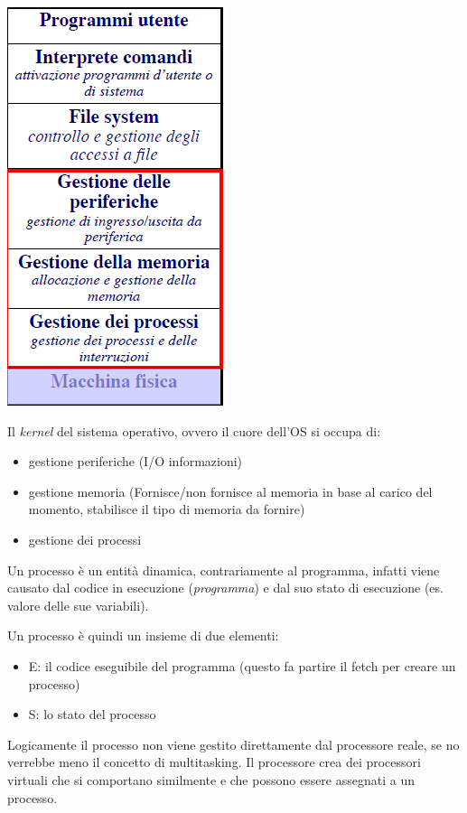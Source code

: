 \documentclass[
  paper=a4,
  oneside  ,captions=tableheading
]{scrbook}
\providecommand{\tightlist}{%
  \setlength{\itemsep}{0pt}\setlength{\parskip}{0pt}}
\begin{document}
\includegraphics{./image/image-2020112323365770.png}

Il \emph{kernel} del sistema operativo, ovvero il cuore dell'OS si
occupa di:

\begin{itemize}
\tightlist
\item
  gestione periferiche (I/O informazioni)
\item
  gestione memoria (Fornisce/non fornisce al memoria in base al carico
  del momento, stabilisce il tipo di memoria da fornire)
\item
  gestione dei processi
\end{itemize}

Un processo è un entità dinamica, contrariamente al programma, infatti
viene causato dal codice in esecuzione (\emph{programma}) e dal suo
stato di esecuzione (es. valore delle sue variabili).

Un processo è quindi un insieme di due elementi:

\begin{itemize}
\tightlist
\item
  E: il codice eseguibile del programma (questo fa partire il fetch per
  creare un processo)
\item
  S: lo stato del processo
\end{itemize}

Logicamente il processo non viene gestito direttamente dal processore
reale, se no verrebbe meno il concetto di multitasking. Il processore
crea dei processori virtuali che si comportano similmente e che possono
essere assegnati a un processo.
\end{document}
